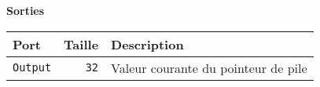 \documentclass{article}
\begin{document}
    \vspace{1em}
    \textbf{Sorties}\\

    \begin{tabular}{|l|r|l|}
        \hline
        \textbf{Port}   & \textbf{Taille} & \textbf{Description}                \\
        \hline

        \hline
        \texttt{Output} & \texttt{32}     & Valeur courante du pointeur de pile \\

        \hline
    \end{tabular}
\end{document}
